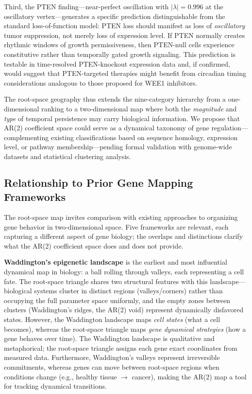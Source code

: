 \documentclass[11pt,letterpaper]{article}
\begin{document}
Third, the PTEN finding---near-perfect oscillation with $|\lambda| = 0.996$ at the oscillatory vertex---generates a specific prediction distinguishable from the standard loss-of-function model: PTEN loss should manifest as loss of \textit{oscillatory} tumor suppression, not merely loss of expression level. If PTEN normally creates rhythmic windows of growth permissiveness, then PTEN-null cells experience constitutive rather than temporally gated growth signaling. This prediction is testable in time-resolved PTEN-knockout expression data and, if confirmed, would suggest that PTEN-targeted therapies might benefit from circadian timing considerations analogous to those proposed for WEE1 inhibitors.

The root-space geography thus extends the nine-category hierarchy from a one-dimensional ranking to a two-dimensional map where both the \textit{magnitude} and \textit{type} of temporal persistence may carry biological information. We propose that AR(2) coefficient space could serve as a dynamical taxonomy of gene regulation---complementing existing classifications based on sequence homology, expression level, or pathway membership---pending formal validation with genome-wide datasets and statistical clustering analysis.

\subsection{Relationship to Prior Gene Mapping Frameworks}

The root-space map invites comparison with existing approaches to organizing gene behavior in two-dimensional space. Five frameworks are relevant, each capturing a different aspect of gene biology; the overlaps and distinctions clarify what the AR(2) coefficient space does and does not provide.

\textbf{Waddington's epigenetic landscape} \citep{waddington1957} is the earliest and most influential dynamical map in biology: a ball rolling through valleys, each representing a cell fate. The root-space triangle shares two structural features with this landscape---biological systems cluster in distinct regions (valleys/corners) rather than occupying the full parameter space uniformly, and the empty zones between clusters (Waddington's ridges, the AR(2) void) represent dynamically disfavored states. However, the Waddington landscape maps \textit{cell states} (what a cell becomes), whereas the root-space triangle maps \textit{gene dynamical strategies} (how a gene behaves over time). The Waddington landscape is qualitative and metaphorical; the root-space triangle assigns each gene exact coordinates from measured data. Furthermore, Waddington's valleys represent irreversible commitments, whereas genes can move between root-space regions when conditions change (e.g., healthy tissue $\rightarrow$ cancer), making the AR(2) map a tool for tracking dynamical transitions.
\end{document}
